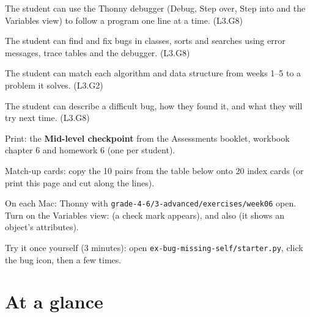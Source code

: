 
\begin{objectives}
  \item The student can use the Thonny debugger (Debug, Step over, Step into and the Variables view) to follow a program one line at a time. (L3.G8)
  \item The student can find and fix bugs in classes, sorts and searches using error messages, trace tables and the debugger. (L3.G8)
  \item The student can match each algorithm and data structure from weeks 1--5 to a problem it solves. (L3.G2)
  \item The student can describe a difficult bug, how they found it, and what they will try next time. (L3.G8)
\end{objectives}

\begin{materials}
  \item Print: the \textbf{Mid-level checkpoint} from the Assessments booklet, workbook chapter 6 and homework 6 (one per student).
  \item Match-up cards: copy the 10 pairs from the table below onto 20 index cards (or print this page and cut along the lines).
  \item On each Mac: Thonny with \texttt{grade-4-6/3-advanced/exercises/week06} open. Turn on the Variables view:  (a check mark appears), and also  (it shows an object's attributes).
  \item Try it once yourself (3 minutes): open \texttt{ex-bug-missing-self/starter.py}, click the bug icon, then  a few times.
\end{materials}

\section{At a glance}
\begin{timeplan}
\end{timeplan}

